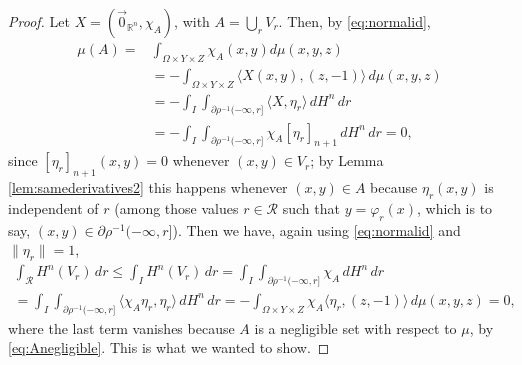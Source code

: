 \documentclass{article}
\newcommand{\R}{\mathbb{R}}
\theoremstyle{definition}
\theoremstyle{remark}
\begin{document}
\begin{proof}
 Let $X=({\vec0_{\R^n}},\chi_A)$, with $A=\bigcup_rV_r$. Then, by \eqref{eq:normalid},
 \begin{equation}\label{eq:Anegligible}
 \begin{aligned}
 \mu(A)=&\int_{\Omega\times Y\times Z}\chi_A(x,y)d\mu(x,y,z)\\
 &=-\int_{\Omega\times Y\times Z}\langle X(x,y),(z,-1)\rangle\,d\mu(x,y,z)\\
 &= - \int_{I}\int_{\partial\rho^{-1}(-\infty,r]}\langle X,\eta_r\rangle\,dH^n\,dr\\
 &=-\int_{I}\int_{\partial\rho^{-1}(-\infty,r]}\chi_A[\eta_r]_{n+1}\,dH^n\,dr=0,
 \end{aligned}
 \end{equation}
 since $[\eta_r]_{n+1}(x,y)=0$ whenever $(x,y)\in V_r$; by Lemma \ref{lem:samederivatives2} this happens whenever $(x,y)\in A$ because $\eta_r(x,y)$ is independent of $r$ (among those values $r\in {\mathcal R}$ such that $y=\varphi_r(x)$, which is to say, $(x,y)\in\partial\rho^{-1}(-\infty,r]$).
 Then we have, again using \eqref{eq:normalid} and $\|\eta_r\|=1$,
 \begin{multline*}
     {\int_{\mathcal R}H^n(V_r)\,dr\leq}
     \int_{I}H^n(V_r)\,dr
     =\int_{I}\int_{\partial\rho^{-1}(-\infty,r]}\chi_A\,dH^n\,dr\\
     =\int_{I}\int_{\partial\rho^{-1}(-\infty,r]}\langle \chi_A\eta_r,\eta_r\rangle\,dH^n\,dr
     =-\int_{\Omega\times Y\times Z}\chi_A\langle \eta_r,(z,-1)\rangle\,d\mu(x,y,z)=0,
 \end{multline*}
 {where the last term vanishes because $A$ is a negligible set with respect to $\mu$, by \eqref{eq:Anegligible}.}
 This is what we wanted to show.
%
%
%
%
%
%
%
%
%
%
%
%
%
%
%
%
%
%
%
%
%
%
%
%
%
%
%
%
%
%
%
%
%
%
%
%
%
%
%
%
\end{proof}
%
%
 
\end{document}
